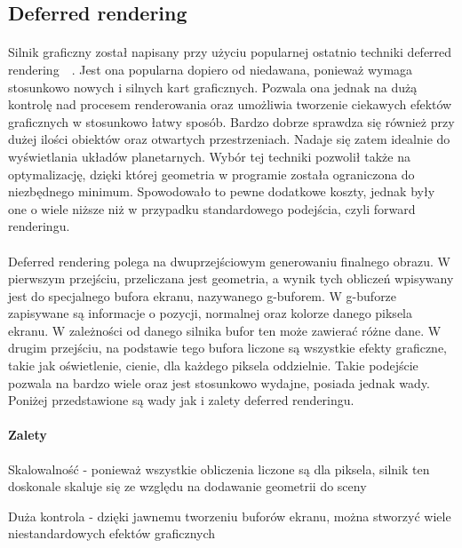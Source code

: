 \subsection{Deferred rendering}\label{sub:deferred rendering}
\paragraph{}

Silnik graficzny został napisany przy użyciu popularnej ostatnio techniki deferred rendering~\cite{gpugems:deferred}~\cite{calver:deferred}. Jest ona popularna dopiero od niedawana, ponieważ wymaga stosunkowo nowych i silnych kart graficznych. Pozwala ona jednak na dużą kontrolę nad procesem renderowania oraz umożliwia tworzenie ciekawych efektów graficznych w stosunkowo łatwy sposób. Bardzo dobrze sprawdza się również przy dużej ilości obiektów oraz otwartych przestrzeniach. Nadaje się zatem idealnie do wyświetlania układów planetarnych. Wybór tej techniki pozwolił także na optymalizację, dzięki której geometria w programie została ograniczona do niezbędnego minimum. Spowodowało to pewne dodatkowe koszty, jednak były one o wiele niższe niż w przypadku standardowego podejścia, czyli forward renderingu.

\paragraph{}

Deferred rendering polega na dwuprzejściowym generowaniu finalnego obrazu. W pierwszym przejściu, przeliczana jest geometria, a wynik tych obliczeń wpisywany jest do specjalnego bufora ekranu, nazywanego g-buforem. W g-buforze zapisywane są informacje o pozycji, normalnej oraz kolorze danego piksela ekranu. W zależności od danego silnika bufor ten może zawierać różne dane. W drugim przejściu, na podstawie tego bufora liczone są wszystkie efekty graficzne, takie jak oświetlenie, cienie, dla każdego piksela oddzielnie. Takie podejście pozwala na bardzo wiele oraz jest stosunkowo wydajne, posiada jednak wady. Poniżej przedstawione są wady jak i zalety deferred renderingu.

\paragraph{Zalety}

\begin{description}
\item{Skalowalność} - ponieważ wszystkie obliczenia liczone są dla piksela, silnik ten doskonale skaluje się ze względu na dodawanie geometrii do sceny
\item{Duża kontrola} - dzięki jawnemu tworzeniu buforów ekranu, można stworzyć wiele niestandardowych efektów graficznych
\end{description}

